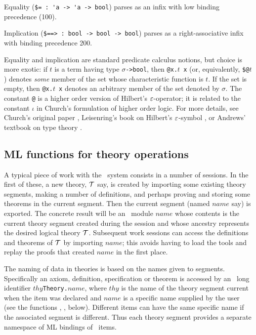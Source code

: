 Equality ({\small\verb+$= : 'a -> 'a -> bool+}) parses as an infix with
low binding precedence (100).

Implication ({\small\verb+$==> : bool -> bool -> bool+}) parses as a
right-associative infix with binding precedence 200.

Equality
and implication are standard predicate calculus notions, but choice is
more exotic:
if $t$ is a term having type $\sigma${\small\verb+->bool+},
then {\small\verb+@x.+}$t${\small\verb+ x+} (or, equivalently,
{\small\verb+$@+}$t$) denotes {\it some\/} member of the set whose
characteristic
 function is $t$. If the set is empty, then
{\small\verb+@x.+}$t${\small\verb+ x+} denotes an arbitrary member of the
set denoted by $\sigma$. The constant {\small\verb+@+} is a higher order
version of Hilbert's
 $\varepsilon$-operator; it is related to the constant
$\iota$ in Church's formulation of higher order logic. For more details,
see Church's
original paper \cite{Church}, Leisenring's
book on Hilbert's $\varepsilon$-symbol \cite{Leisenring}, or Andrews'
textbook on type theory \cite{Andrews}.


\subsection{ML functions for theory operations}
\label{theoryprims}

A typical piece of work
with the \HOL\ system consists in a number of sessions.  In the first of these, a
new theory, ${\cal T}$ say, is created by importing some existing theory
segments, making a number of definitions, and perhaps proving and
storing some theorems in the current segment. Then the current segment
(named $name$ say) is exported. The concrete result will be an \ML\
module $name$ whose contents is the current theory segment
created during the session and whose ancestry represents the desired
logical theory ${\cal T}$. Subsequent work sessions can access the
definitions and theorems of ${\cal T}$ by importing $name$;
this avoids having to load the tools and replay
the proofs that created $name$\ml{Theory} in the first place.

The naming of data in theories is based on the names given to segments.
Specifically an axiom, definition, specification or theorem is
accessed
by an \ML\ long identifier $thy${\small\verb+Theory.+}$name$, where
$thy$ is the name of the theory segment current when the item was
declared and $name$ is a specific name supplied by the user (see the
functions \ml{new\_axiom}, \ml{new\_definition}, below). Different items
can have the same specific name if the associated segment is different.
Thus each theory segment provides a separate namespace of ML bindings of
\HOL\ items.

